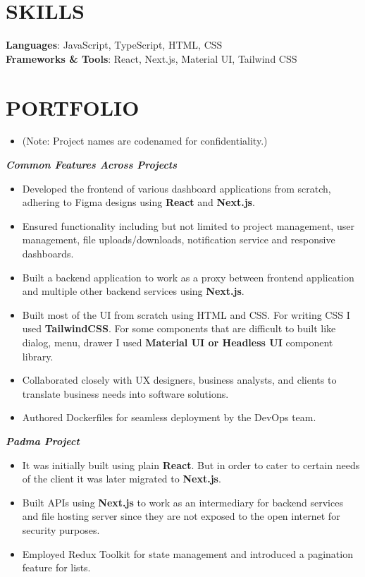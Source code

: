 \documentclass[letterpaper,10pt]{article}
\newcommand{\resumeItem}[1]{
  \item\small{
    {#1 \vspace{-1pt}}
  }
}
\newcommand{\resumeItemListStart}{\begin{itemize}}
\newcommand{\resumeItemListEnd}{\end{itemize}\vspace{0pt}}
\begin{document}
\section{SKILLS}
 \begin{itemize}[leftmargin=0in, label={}]
    \small{\item{
     \textbf{Languages}: \hspace{41pt} {JavaScript, TypeScript, HTML, CSS}\vspace{2pt} \\
     \textbf{Frameworks \& Tools}: \hspace{1pt} {React, Next.js, Material UI, Tailwind CSS}\vspace{2pt} \\
    }}
 \end{itemize}

\section{PORTFOLIO}
    \begin{itemize}[leftmargin=0in, label={}]
        \resumeItem{(Note: Project names are codenamed for confidentiality.)}
    \end{itemize}

    \textit{\textbf{Common Features Across Projects}}
    \resumeItemListStart
        \resumeItem {Developed the frontend of various dashboard applications from scratch, adhering to Figma designs using \textbf{React} and \textbf{Next.js}.}
        \resumeItem {Ensured functionality including but not limited to project management, user management, file uploads/downloads, notification service and responsive dashboards.}
        \resumeItem {Built a backend application to work as a proxy between frontend application and multiple other backend services using \textbf{Next.js}.}
        \resumeItem {Built most of the UI from scratch using HTML and CSS. For writing CSS I used \textbf{TailwindCSS}. For some components that are difficult to built like dialog, menu, drawer I used \textbf{Material UI or Headless UI} component library.}
        \resumeItem{Collaborated closely with UX designers, business analysts, and clients to translate business needs into software solutions.}
        \resumeItem{Authored Dockerfiles for seamless deployment by the DevOps team.}
        
    \resumeItemListEnd
    
    \textit{\textbf{Padma Project}}
    \resumeItemListStart
        \resumeItem {It was initially built using plain \textbf{React}. But in order to cater to certain needs of the client it was later migrated to \textbf{Next.js}.}
        \resumeItem{Built APIs using \textbf{Next.js} to work as an intermediary for backend services and file hosting server since they are not exposed to the open internet for security purposes.}
        \resumeItem{Employed Redux Toolkit for state management and introduced a pagination feature for lists.}
    \resumeItemListEnd
\end{document}
